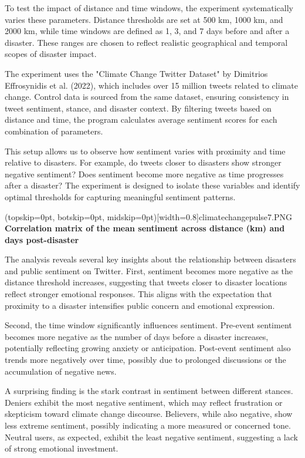 \documentclass{ieeeaccess}
\begin{document}
To test the impact of distance and time windows, the experiment systematically varies these parameters. Distance thresholds are set at 500 km, 1000 km, and 2000 km, while time windows are defined as 1, 3, and 7 days before and after a disaster. These ranges are chosen to reflect realistic geographical and temporal scopes of disaster impact.

The experiment uses the "Climate Change Twitter Dataset" by Dimitrios Effrosynidis et al. (2022), which includes over 15 million tweets related to climate change. Control data is sourced from the same dataset, ensuring consistency in tweet sentiment, stance, and disaster context. By filtering tweets based on distance and time, the program calculates average sentiment scores for each combination of parameters.

This setup allows us to observe how sentiment varies with proximity and time relative to disasters. For example, do tweets closer to disasters show stronger negative sentiment? Does sentiment become more negative as time progresses after a disaster? The experiment is designed to isolate these variables and identify optimal thresholds for capturing meaningful sentiment patterns.

\Figure[t!](topskip=0pt, botskip=0pt, midskip=0pt)[width=0.8\columnwidth]{climatechangepulse7.PNG}
{ \textbf{Correlation matrix of the mean sentiment across distance (km) and days post-disaster}\label{fig6}}

The analysis reveals several key insights about the relationship between disasters and public sentiment on Twitter. First, sentiment becomes more negative as the distance threshold increases, suggesting that tweets closer to disaster locations reflect stronger emotional responses. This aligns with the expectation that proximity to a disaster intensifies public concern and emotional expression.

Second, the time window significantly influences sentiment. Pre-event sentiment becomes more negative as the number of days before a disaster increases, potentially reflecting growing anxiety or anticipation. Post-event sentiment also trends more negatively over time, possibly due to prolonged discussions or the accumulation of negative news.

A surprising finding is the stark contrast in sentiment between different stances. Deniers exhibit the most negative sentiment, which may reflect frustration or skepticism toward climate change discourse. Believers, while also negative, show less extreme sentiment, possibly indicating a more measured or concerned tone. Neutral users, as expected, exhibit the least negative sentiment, suggesting a lack of strong emotional investment.
\end{document}
